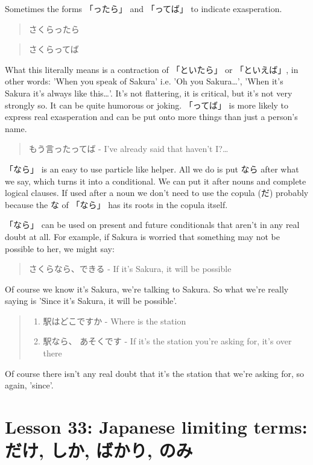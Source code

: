 \documentclass[11pt]{article}
\begin{document}
Sometimes the forms 「ったら」 and 「ってば」 to indicate exasperation.
\begin{quote}
さくらったら
\end{quote}
\begin{quote}
さくらってば
\end{quote}
What this literally means is a contraction of 「といたら」 or 「といえば」, in other words: 'When you speak of Sakura' i.e. 'Oh you Sakura\ldots{}', 'When it's Sakura it's always like this\ldots{}'. It's not flattering, it is critical, but it's not very strongly so. It can be quite humorous or joking. 「ってば」 is more likely to express real exasperation and can be put onto more things than just a person's name.
\begin{quote}
もう言ったってば - I've already said that haven't I?\ldots{}
\end{quote}

「なら」 is an easy to use particle like helper. All we do is put なら after what we say, which turns it into a conditional. We can put it after nouns and complete logical clauses. If used after a noun we don't need to use the copula (だ) probably because the な of 「なら」 has its roots in the copula itself.

「なら」 can be used on present and future conditionals that aren't in any real doubt at all. For example, if Sakura is worried that something may not be possible to her, we might say:
\begin{quote}
さくらなら、できる - If it's Sakura, it will be possible
\end{quote}
Of course we know it's Sakura, we're talking to Sakura. So what we're really saying is 'Since it's Sakura, it will be possible'.
\begin{quote}
\begin{enumerate}
\item 駅はどこですか - Where is the station
\item 駅なら、 あそくです - If it's the station you're asking for, it's over there
\end{enumerate}
\end{quote}
Of course there isn't any real doubt that it's the station that we're asking for, so again, 'since'.

\section{Lesson 33: Japanese limiting terms: だけ, しか, ばかり, のみ}
\label{sec:org4e86d81}
\end{document}
